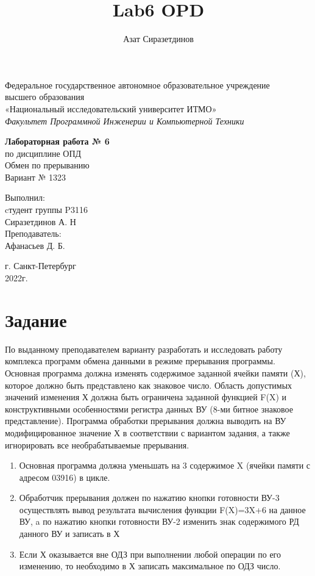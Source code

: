 \documentclass[12pt]{article}
\title{Lab6 OPD}
\author{Азат Сиразетдинов}
\begin{document}
	\thispagestyle{empty}
	\begin{center}
		Федеральное государственное автономное образовательное учреждение\\ 
		высшего образования\\
		«Национальный исследовательский университет ИТМО»\\
		\textit{Факультет Программной Инженерии и Компьютерной Техники}\\
	\end{center}
	\vspace{2cm}
	\begin{center}
		\large
		\textbf{Лабораторная работа № 6}\\
		по дисциплине ОПД\\
		Обмен по прерыванию\\
		Вариант № 1323
	\end{center}
	\vspace{7cm}
	\begin{flushright}
		Выполнил:\\
		cтудент  группы P3116\\
		Сиразетдинов А. Н\\
		Преподаватель: \\
		Афанасьев Д. Б.\\
	\end{flushright}
	\vspace{6cm}
	\begin{center}
		г. Санкт-Петербург\\
		2022г.
	\end{center}
	\newpage
	
	\tableofcontents
	
	\newpage
	\section{Задание}
	
	По выданному преподавателем варианту разработать и исследовать работу комплекса программ обмена данными в режиме прерывания программы. Основная программа должна изменять содержимое заданной ячейки памяти (Х), которое должно быть представлено как знаковое число. Область допустимых значений изменения Х должна быть ограничена заданной функцией F(X) и конструктивными особенностями регистра данных ВУ (8-ми битное знаковое представление). Программа обработки прерывания должна выводить на ВУ модифицированное значение Х в соответствии с вариантом задания, а также игнорировать все необрабатываемые прерывания.
	\begin{enumerate}
		\item Основная программа должна уменьшать на 3 содержимое X (ячейки памяти с адресом 03916) в цикле.
		\item Обработчик прерывания должен по нажатию кнопки готовности ВУ-3 осуществлять вывод результата вычисления функции F(X)=3X+6 на данное ВУ, a по нажатию кнопки готовности ВУ-2 изменить знак содержимого РД данного ВУ и записать в Х
		\item Если Х оказывается вне ОДЗ при выполнении любой операции по его изменению, то необходимо в Х записать максимальное по ОДЗ число.
	\end{enumerate}
\end{document}
